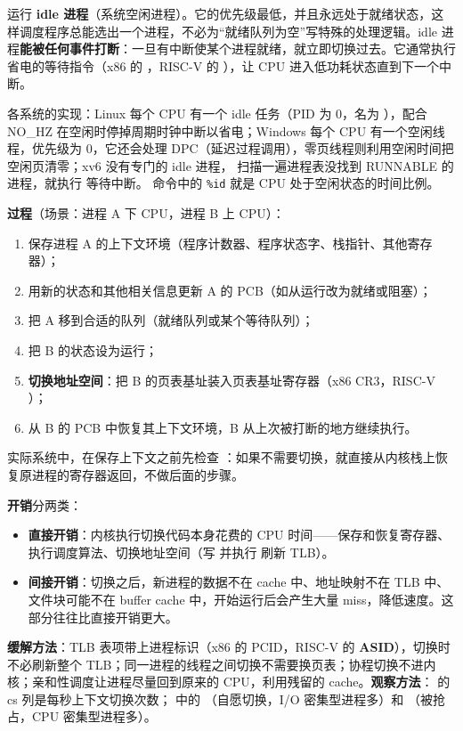 运行 \textbf{idle 进程}（系统空闲进程）。它的优先级最低，并且永远处于就绪状态，这样调度程序总能选出一个进程，不必为“就绪队列为空”写特殊的处理逻辑。idle 进程\textbf{能被任何事件打断}：一旦有中断使某个进程就绪，就立即切换过去。它通常执行省电的等待指令（x86 的 ，RISC-V 的 ），让 CPU 进入低功耗状态直到下一个中断。

各系统的实现：Linux 每个 CPU 有一个 idle 任务（PID 为 0，名为 ），配合 NO\_HZ 在空闲时停掉周期时钟中断以省电；Windows 每个 CPU 有一个空闲线程，优先级为 0，它还会处理 DPC（延迟过程调用），零页线程则利用空闲时间把空闲页清零；xv6 没有专门的 idle 进程， 扫描一遍进程表没找到 RUNNABLE 的进程，就执行  等待中断。 命令中的 \texttt{\%id} 就是 CPU 处于空闲状态的时间比例。

\textbf{过程}（场景：进程 A 下 CPU，进程 B 上 CPU）：
\begin{enumerate}
    \item 保存进程 A 的上下文环境（程序计数器、程序状态字、栈指针、其他寄存器）；
    \item 用新的状态和其他相关信息更新 A 的 PCB（如从运行改为就绪或阻塞）；
    \item 把 A 移到合适的队列（就绪队列或某个等待队列）；
    \item 把 B 的状态设为运行；
    \item \textbf{切换地址空间}：把 B 的页表基址装入页表基址寄存器（x86 CR3，RISC-V ）；
    \item 从 B 的 PCB 中恢复其上下文环境，B 从上次被打断的地方继续执行。
\end{enumerate}
实际系统中，在保存上下文之前先检查 ：如果不需要切换，就直接从内核栈上恢复原进程的寄存器返回，不做后面的步骤。

\textbf{开销}分两类：
\begin{itemize}
    \item \textbf{直接开销}：内核执行切换代码本身花费的 CPU 时间——保存和恢复寄存器、执行调度算法、切换地址空间（写  并执行  刷新 TLB）。
    \item \textbf{间接开销}：切换之后，新进程的数据不在 cache 中、地址映射不在 TLB 中、文件块可能不在 buffer cache 中，开始运行后会产生大量 miss，降低速度。这部分往往比直接开销更大。
\end{itemize}
\textbf{缓解方法}：TLB 表项带上进程标识（x86 的 PCID，RISC-V 的 \textbf{ASID}），切换时不必刷新整个 TLB；同一进程的线程之间切换不需要换页表；协程切换不进内核；亲和性调度让进程尽量回到原来的 CPU，利用残留的 cache。\textbf{观察方法}： 的 cs 列是每秒上下文切换次数； 中的 （自愿切换，I/O 密集型进程多）和 （被抢占，CPU 密集型进程多）。

